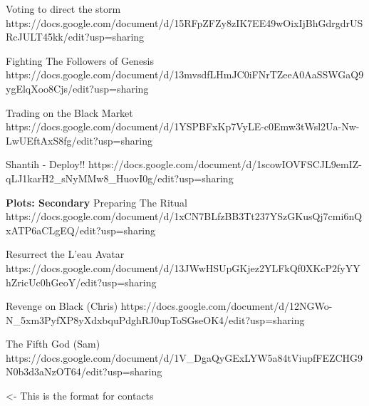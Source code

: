 \documentclass[char]{GL2020}
\begin{document}
Voting to direct the storm
https://docs.google.com/document/d/15RFpZFZy8zIK7EE49wOixIjBhGdrgdrUSRcJULT45kk/edit?usp=sharing

Fighting The Followers of Genesis
https://docs.google.com/document/d/13mvsdfLHmJC0iFNrTZeeA0AaSSWGaQ9ygElqXoo8Cjs/edit?usp=sharing

Trading on the Black Market
https://docs.google.com/document/d/1YSPBFxKp7VyLE-c0Emw3tWsl2Ua-Nw-LwUEftAxS8fg/edit?usp=sharing

Shantih - Deploy!!
https://docs.google.com/document/d/1scowIOVFSCJL9emIZ-qLJ1karH2_sNyMMw8_HuovI0g/edit?usp=sharing

\textbf{Plots: Secondary}
Preparing The Ritual 
https://docs.google.com/document/d/1xCN7BLfzBB3Tt237YSzGKusQj7cmi6nQxATP6aCLgEQ/edit?usp=sharing

Resurrect the L'eau Avatar
https://docs.google.com/document/d/13JWwHSUpGKjez2YLFkQf0XKcP2fyYYhZricUc0hGeoY/edit?usp=sharing

Revenge on Black (Chris)
https://docs.google.com/document/d/12NGWo-N_5xm3PyfXP8yXdxbquPdghRJ0upToSGseOK4/edit?usp=sharing

The Fifth God (Sam)
https://docs.google.com/document/d/1V_DgaQyGExLYW5a84tViupfFEZCHG9N0b3d3aNzOT64/edit?usp=sharing



\begin{itemz}[Goals]
	\item 
\end{itemz}

\begin{itemz}[Notes]
	\item 
\end{itemz}

\begin{contacts}
	\contact{\cTest{}} <- This is the format for contacts 
\end{contacts}
\end{document}
